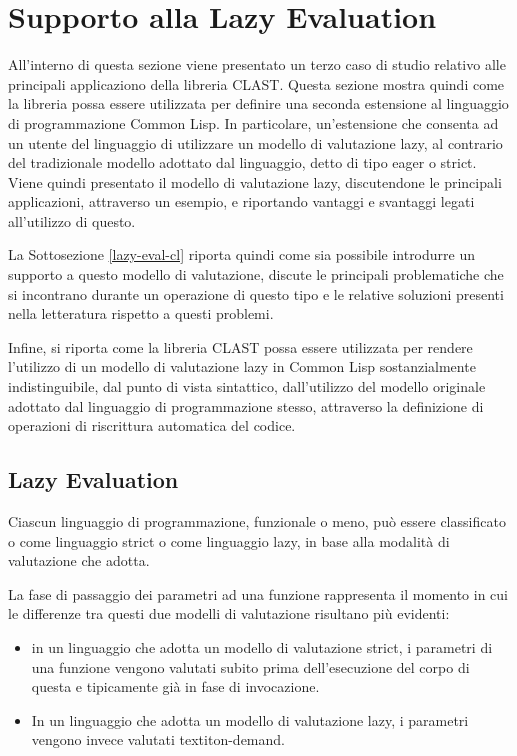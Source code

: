 \section{Supporto alla Lazy Evaluation}
\label{lazy-evaluation}

All'interno di questa sezione viene presentato un terzo caso di studio relativo
alle principali applicaziono della libreria CLAST. Questa sezione mostra quindi
come la libreria possa essere utilizzata per definire una seconda estensione al
linguaggio di programmazione Common Lisp. In particolare, un'estensione che
consenta ad un utente del linguaggio di utilizzare un modello di valutazione
lazy, al contrario del tradizionale modello adottato dal linguaggio, detto di
tipo eager o strict.\\

Viene quindi presentato il modello di valutazione lazy, discutendone le
principali applicazioni, attraverso un esempio, e riportando vantaggi e
svantaggi legati all'utilizzo di questo.

La Sottosezione \ref{lazy-eval-cl} riporta quindi come sia possibile introdurre
un supporto a questo modello di valutazione, discute le principali problematiche
che si incontrano durante un operazione di questo tipo e le relative soluzioni
presenti nella letteratura rispetto a questi problemi.

Infine, si riporta come la libreria CLAST possa essere utilizzata per rendere
l'utilizzo di un modello di valutazione lazy in Common Lisp sostanzialmente
indistinguibile, dal punto di vista sintattico, dall'utilizzo del modello
originale adottato dal linguaggio di programmazione stesso, attraverso la
definizione di operazioni di riscrittura automatica del codice.

\subsection{Lazy Evaluation}

Ciascun linguaggio di programmazione, funzionale o meno, può essere classificato
o come linguaggio strict o come linguaggio lazy, in base alla modalità di
valutazione che adotta.

La fase di passaggio dei parametri ad una funzione rappresenta il momento in cui
le differenze tra questi due modelli di valutazione risultano più evidenti:

\begin{itemize}

\item in un linguaggio che adotta un modello di valutazione strict, i parametri
di una funzione vengono valutati subito prima dell'esecuzione del corpo di
questa e tipicamente già in fase di invocazione.

\item In un linguaggio che adotta un modello di valutazione lazy, i parametri
vengono invece valutati textit{on-demand}.

\end{itemize}

